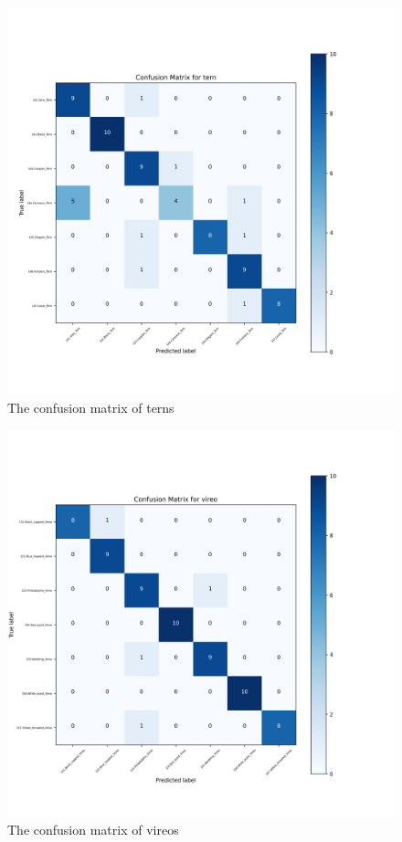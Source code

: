 \documentclass[twocolumn]{extarticle}
\begin{document}
\begin{figure}[H]
\centering
\includegraphics[width=0.95\linewidth]{figure/eval_high_temp_tern}
\caption{The confusion matrix of terns}
\label{fig:evalhightemptern}
\end{figure}
\begin{figure}[H]
\centering
\includegraphics[width=0.95\linewidth]{figure/eval_high_temp_vireo}
\caption{The confusion matrix of vireos}
\label{fig:evalhightempvireo}
\end{figure}
\end{document}
